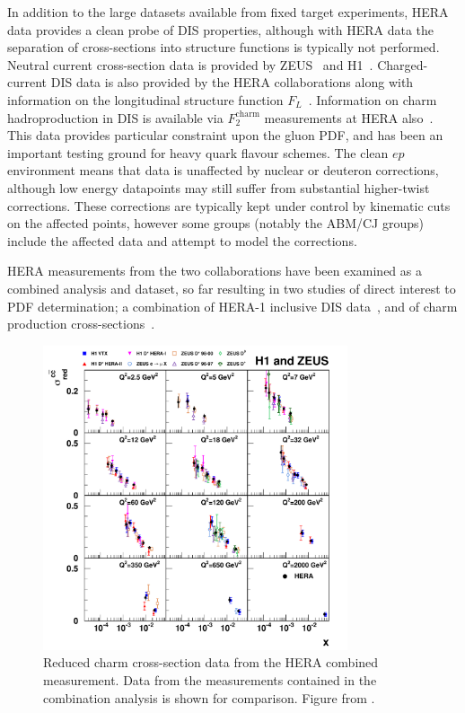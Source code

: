 In addition to the large datasets available from fixed target experiments, HERA data provides a clean probe of DIS properties, although with HERA data the separation of cross-sections into structure functions is typically not performed. Neutral current cross-section data is provided by ZEUS~\cite{Breitweg:1998dz,Chekanov:2001qu,Chekanov:2002ej,Chekanov:2003yv} and H1~\cite{Adloff:2000qk,Adloff:2000qj,Adloff:2003uh}. Charged-current DIS data is also provided by the HERA collaborations \cite{Chekanov:2003vw,Adloff:2003uh} along with information on the longitudinal structure function $F_L$~\cite{Andreev:2013vha,Chekanov:2009na}. Information on charm hadroproduction in DIS is available via $F_2^{\mathrm{charm}}$ measurements at HERA also~\cite{Adloff:1996xq,Adloff:2001zj,Aktas:2005iw,Aktas:2004az,Breitweg:1999ad,Chekanov:2003rb,Chekanov:2007ch}. This data provides particular constraint upon the gluon PDF, and has been an important testing ground for heavy quark flavour schemes. The clean $ep$ environment means that data is unaffected by nuclear or deuteron corrections, although low energy datapoints may still suffer from substantial higher-twist corrections. These corrections are typically kept under control by kinematic cuts on the affected points, however some groups (notably the ABM/CJ groups) include the affected data and attempt to model the corrections.

HERA measurements from the two collaborations have been examined as a combined analysis and dataset, so far resulting in two studies of direct interest to PDF determination; a combination of HERA-1 inclusive DIS data~\cite{aaron:2009wt}, and of charm production cross-sections~\cite{Abramowicz:1900rp}.

\begin{figure}[ht]
\centering
\includegraphics[width=0.8\textwidth]{3-PDFdet/figs/d12-172f3.pdf}
\caption[Combined reduced charm cross-section data from HERA]{Reduced charm cross-section data from the HERA combined measurement. Data from the measurements contained in the combination analysis is shown for comparison. Figure from \cite{Abramowicz:1900rp}.}
\label{fig:HERAF2c}
\end{figure}

